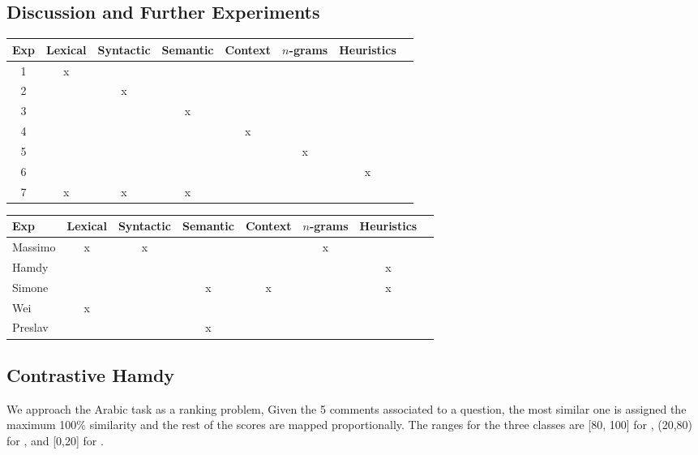 \subsection{Discussion and Further Experiments} \label{sec:expdiscussion}


\begin{table*}
\begin{tabular}{|c|c|c|c|c|c|c|c|}
\hline
Exp&Lexical & Syntactic & Semantic & Context & $n$-grams & Heuristics\\ 
\hline
1	& x	& 	& 	& 	& 	& 		\\
2	& 	& x	& 	& 	& 	& 		\\
3	& 	& 	& x	& 	& 	& 		\\
4	& 	& 	& 	& x	& 	& 		\\
5	& 	& 	& 	& 	& x	& 		\\
6	& 	& 	& 	& 	& 	& x		\\
7	& x	& x	& x	& 	& 	& 	 	\\
\hline
\end{tabular}



\begin{tabular}{|l|c|c|c|c|c|c|c|}
\hline
Exp	&Lexical & Syntactic & Semantic & Context & $n$-grams & Heuristics\\ 
\hline
Massimo	& x	& x	& 	& 	& x	& 		\\
Hamdy	& 	& 	& 	& 	& 	& x		\\
Simone	& 	& 	& x	& x	& 	& x		\\
Wei	& x	& 	& 	& 	& 	& 		\\
Preslav	& 	& 	& x	& 	& 	& 		\\

\hline
\end{tabular}



\caption{Experiments with features subsets.} 
 
 
 
\end{table*}



\subsection{Contrastive Hamdy}
\label{tmp}

We approach the Arabic task as a ranking problem, Given the 5 comments 
associated to a question, the most similar one is assigned the maximum 100\% 
similarity and the rest of the scores are mapped proportionally. The ranges 
for the three classes are [80, 100] for \dir, (20,80) for \rel, and [0,20] 
for \irel.

